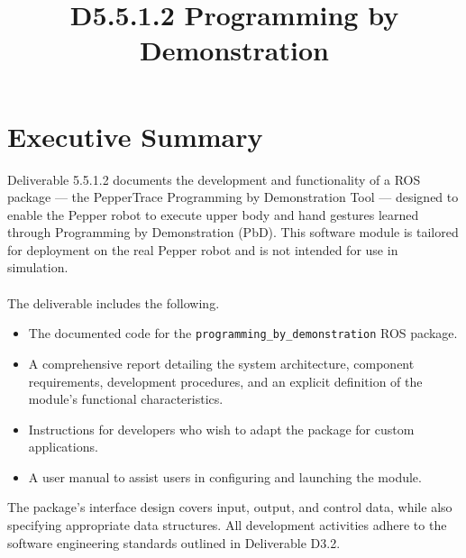 \documentclass{CSSRforAfrica}
\begin{document}



\title{D5.5.1.2 Programming by Demonstration}     

\partner{}                                %




\maketitle
 

\section*{Executive Summary}
\label{executive_summary}
 
Deliverable 5.5.1.2 documents the development and functionality of a ROS package --- the PepperTrace Programming by Demonstration Tool --- designed to enable the Pepper robot to execute upper body and hand gestures learned through Programming by Demonstration (PbD). This software module is tailored for deployment on the real Pepper robot and is not intended for use in simulation.
\\~\\
\noindent
The deliverable includes the following.
\begin{itemize}
    \item The documented code for the \texttt{programming\_by\_demonstration} ROS package.
    \item A comprehensive report detailing the system architecture, component requirements, development procedures, and an explicit definition of the module's functional characteristics.
    \item Instructions for developers who wish to adapt the package for custom applications.
    \item A user manual to assist users in configuring and launching the module.
\end{itemize}
\noindent
The package's interface design covers input, output, and control data, while also specifying appropriate data structures. All development activities adhere to the software engineering standards outlined in Deliverable D3.2.
\\~\\
\noindent
\end{document}
